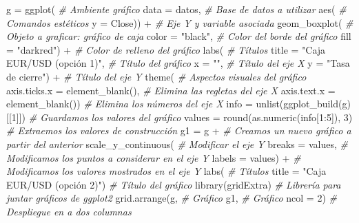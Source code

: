 \documentclass[
]{book}
\newenvironment{Shaded}{\begin{snugshade}}{\end{snugshade}}
\newcommand{\AttributeTok}[1]{\textcolor[rgb]{0.77,0.63,0.00}{#1}}
\newcommand{\CommentTok}[1]{\textcolor[rgb]{0.56,0.35,0.01}{\textit{#1}}}
\newcommand{\DecValTok}[1]{\textcolor[rgb]{0.00,0.00,0.81}{#1}}
\newcommand{\FunctionTok}[1]{\textcolor[rgb]{0.00,0.00,0.00}{#1}}
\newcommand{\NormalTok}[1]{#1}
\newcommand{\OtherTok}[1]{\textcolor[rgb]{0.56,0.35,0.01}{#1}}
\newcommand{\SpecialCharTok}[1]{\textcolor[rgb]{0.00,0.00,0.00}{#1}}
\newcommand{\StringTok}[1]{\textcolor[rgb]{0.31,0.60,0.02}{#1}}
\theoremstyle{definition}
\theoremstyle{definition}
\theoremstyle{definition}
\theoremstyle{definition}
\theoremstyle{remark}
\begin{document}
\begin{Shaded}
\begin{Highlighting}[]
\NormalTok{g }\OtherTok{=} \FunctionTok{ggplot}\NormalTok{( }\CommentTok{\# Ambiente gráfico}
  \AttributeTok{data =}\NormalTok{ datos, }\CommentTok{\# Base de datos a utilizar}
  \FunctionTok{aes}\NormalTok{( }\CommentTok{\# Comandos estéticos}
    \AttributeTok{y =}\NormalTok{ Close)) }\SpecialCharTok{+} \CommentTok{\# Eje Y y variable asociada}
  \FunctionTok{geom\_boxplot}\NormalTok{( }\CommentTok{\# Objeto a graficar: gráfico de caja}
    \AttributeTok{color =} \StringTok{"black"}\NormalTok{, }\CommentTok{\# Color del borde del gráfico}
    \AttributeTok{fill =} \StringTok{"darkred"}\NormalTok{) }\SpecialCharTok{+} \CommentTok{\# Color de relleno del gráfico}
  \FunctionTok{labs}\NormalTok{( }\CommentTok{\# Títulos }
    \AttributeTok{title =} \StringTok{"Caja EUR/USD (opción 1)"}\NormalTok{, }\CommentTok{\# Título del gráfico}
    \AttributeTok{x =} \StringTok{""}\NormalTok{, }\CommentTok{\# Título del eje X}
    \AttributeTok{y =} \StringTok{"Tasa de cierre"}\NormalTok{) }\SpecialCharTok{+} \CommentTok{\# Título del eje Y}
  \FunctionTok{theme}\NormalTok{( }\CommentTok{\# Aspectos visuales del gráfico}
    \AttributeTok{axis.ticks.x =} \FunctionTok{element\_blank}\NormalTok{(), }\CommentTok{\# Elimina las regletas del eje X}
    \AttributeTok{axis.text.x =} \FunctionTok{element\_blank}\NormalTok{()) }\CommentTok{\# Elimina los números del eje X}
\NormalTok{info }\OtherTok{=} \FunctionTok{unlist}\NormalTok{(}\FunctionTok{ggplot\_build}\NormalTok{(g)[[}\DecValTok{1}\NormalTok{]]) }\CommentTok{\# Guardamos los valores del gráfico}
\NormalTok{values }\OtherTok{=} \FunctionTok{round}\NormalTok{(}\FunctionTok{as.numeric}\NormalTok{(info[}\DecValTok{1}\SpecialCharTok{:}\DecValTok{5}\NormalTok{]), }\DecValTok{3}\NormalTok{) }\CommentTok{\# Extraemos los valores de construcción}
\NormalTok{g1 }\OtherTok{=}\NormalTok{ g }\SpecialCharTok{+} \CommentTok{\# Creamos un nuevo gráfico a partir del anterior}
  \FunctionTok{scale\_y\_continuous}\NormalTok{( }\CommentTok{\# Modificar el eje Y}
    \AttributeTok{breaks =}\NormalTok{ values, }\CommentTok{\# Modificamos los puntos a considerar en el eje Y}
    \AttributeTok{labels =}\NormalTok{ values) }\SpecialCharTok{+} \CommentTok{\# Modificamos los valores mostrados en el eje Y}
  \FunctionTok{labs}\NormalTok{( }\CommentTok{\# Títulos}
    \AttributeTok{title =} \StringTok{"Caja EUR/USD (opción 2)"}\NormalTok{) }\CommentTok{\# Título del gráfico}
\FunctionTok{library}\NormalTok{(gridExtra) }\CommentTok{\# Librería para juntar gráficos de ggplot2}
\FunctionTok{grid.arrange}\NormalTok{(g, }\CommentTok{\# Gráfico}
\NormalTok{             g1, }\CommentTok{\# Gráfico}
             \AttributeTok{ncol =} \DecValTok{2}\NormalTok{) }\CommentTok{\# Despliegue en a dos columnas }
\end{Highlighting}
\end{Shaded}
\end{document}
